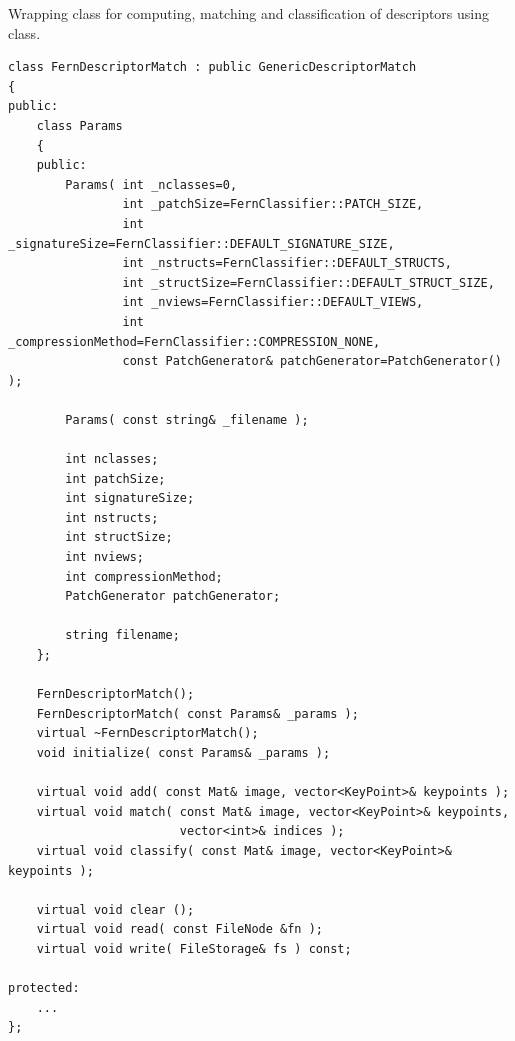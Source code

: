 Wrapping class for computing, matching and classification of descriptors using  class.

\begin{lstlisting}
class FernDescriptorMatch : public GenericDescriptorMatch
{
public:
    class Params
    {
    public:
        Params( int _nclasses=0,
                int _patchSize=FernClassifier::PATCH_SIZE,
                int _signatureSize=FernClassifier::DEFAULT_SIGNATURE_SIZE,
                int _nstructs=FernClassifier::DEFAULT_STRUCTS,
                int _structSize=FernClassifier::DEFAULT_STRUCT_SIZE,
                int _nviews=FernClassifier::DEFAULT_VIEWS,
                int _compressionMethod=FernClassifier::COMPRESSION_NONE,
                const PatchGenerator& patchGenerator=PatchGenerator() );

        Params( const string& _filename );

        int nclasses;
        int patchSize;
        int signatureSize;
        int nstructs;
        int structSize;
        int nviews;
        int compressionMethod;
        PatchGenerator patchGenerator;

        string filename;
    };

    FernDescriptorMatch();
    FernDescriptorMatch( const Params& _params );
    virtual ~FernDescriptorMatch();
    void initialize( const Params& _params );

    virtual void add( const Mat& image, vector<KeyPoint>& keypoints );
    virtual void match( const Mat& image, vector<KeyPoint>& keypoints, 
                        vector<int>& indices );
    virtual void classify( const Mat& image, vector<KeyPoint>& keypoints );

    virtual void clear ();
    virtual void read( const FileNode &fn );
    virtual void write( FileStorage& fs ) const;
    
protected:
	...
};
\end{lstlisting}

\fi
